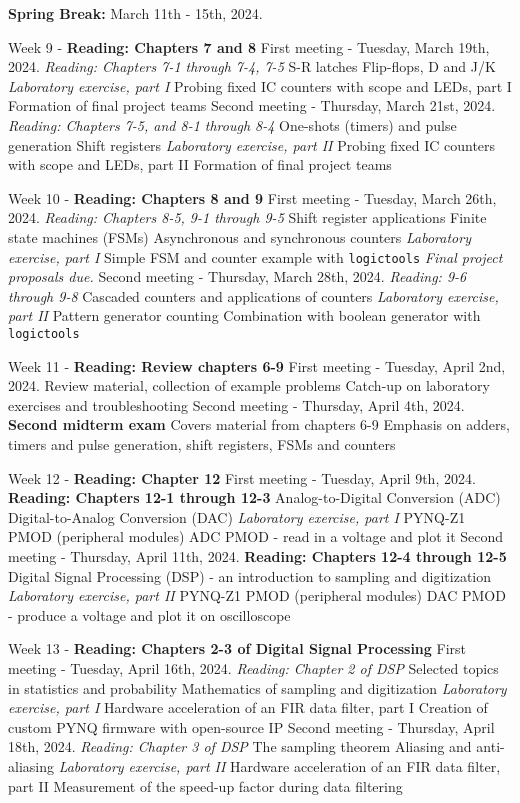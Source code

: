 \documentclass[10pt]{article}
\begin{document}
\begin{outline}[enumerate]
\1 \textbf{Spring Break:} March 11th - 15th, 2024.

\1 Week 9 - \textbf{Reading: Chapters 7 and 8}
\2 First meeting - Tuesday, March 19th, 2024. \textit{Reading: Chapters 7-1 through 7-4, 7-5}
\3 S-R latches
\3 Flip-flops, D and J/K
\3 \textit{Laboratory exercise, part I}
\4 Probing fixed IC counters with scope and LEDs, part I
\4 Formation of final project teams
\2 Second meeting - Thursday, March 21st, 2024. \textit{Reading: Chapters 7-5, and 8-1 through 8-4}
\3 One-shots (timers) and pulse generation
\3 Shift registers
\3 \textit{Laboratory exercise, part II}
\4 Probing fixed IC counters with scope and LEDs, part II
\4 Formation of final project teams

\1 Week 10 - \textbf{Reading: Chapters 8 and 9}
\2 First meeting - Tuesday, March 26th, 2024. \textit{Reading: Chapters 8-5, 9-1 through 9-5}
\3 Shift register applications
\3 Finite state machines (FSMs)
\3 Asynchronous and synchronous counters
\3 \textit{Laboratory exercise, part I}
\4 Simple FSM and counter example with \verb+logictools+
\4 \textit{Final project proposals due.}
\2 Second meeting - Thursday, March 28th, 2024. \textit{Reading: 9-6 through 9-8}
\3 Cascaded counters and applications of counters
\3 \textit{Laboratory exercise, part II}
\4 Pattern generator counting
\4 Combination with boolean generator with \verb+logictools+

\1 Week 11 - \textbf{Reading: Review chapters 6-9}
\2 First meeting - Tuesday, April 2nd, 2024.
\3 Review material, collection of example problems
\3 Catch-up on laboratory exercises and troubleshooting
\2 Second meeting - Thursday, April 4th, 2024.
\3 \textbf{Second midterm exam}
\4 Covers material from chapters 6-9
\4 Emphasis on adders, timers and pulse generation, shift registers, FSMs and counters

\1 Week 12 - \textbf{Reading: Chapter 12}
\2 First meeting - Tuesday, April 9th, 2024. \textbf{Reading: Chapters 12-1 through 12-3}
\3 Analog-to-Digital Conversion (ADC)
\3 Digital-to-Analog Conversion (DAC)
\3 \textit{Laboratory exercise, part I}
\4 PYNQ-Z1 PMOD (peripheral modules)
\4 ADC PMOD - read in a voltage and plot it
\2 Second meeting - Thursday, April 11th, 2024. \textbf{Reading: Chapters 12-4 through 12-5}
\3 Digital Signal Processing (DSP) - an introduction to sampling and digitization
\3 \textit{Laboratory exercise, part II}
\4 PYNQ-Z1 PMOD (peripheral modules)
\4 DAC PMOD - produce a voltage and plot it on oscilloscope

\1 Week 13 - \textbf{Reading: Chapters 2-3 of Digital Signal Processing}
\2 First meeting - Tuesday, April 16th, 2024. \textit{Reading: Chapter 2 of DSP}
\3 Selected topics in statistics and probability
\3 Mathematics of sampling and digitization
\3 \textit{Laboratory exercise, part I}
\4 Hardware acceleration of an FIR data filter, part I
\4 Creation of custom PYNQ firmware with open-source IP
\2 Second meeting - Thursday, April 18th, 2024. \textit{Reading: Chapter 3 of DSP}
\3 The sampling theorem
\3 Aliasing and anti-aliasing
\3 \textit{Laboratory exercise, part II}
\4 Hardware acceleration of an FIR data filter, part II
\4 Measurement of the speed-up factor during data filtering


\end{outline}
\end{document}
